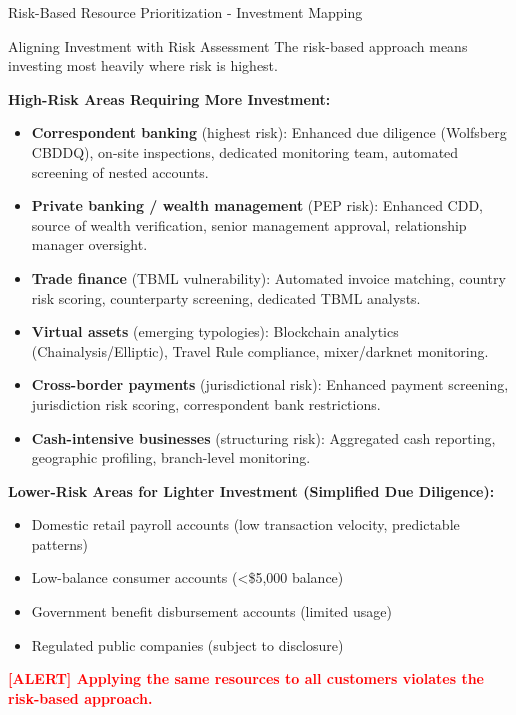 \documentclass[11pt,a4paper]{beamer}
\newcommand{\redflag}[1]{\textcolor{red}{\textbf{[ALERT] #1}}}
\begin{document}
\begin{frame}{Risk-Based Resource Prioritization - Investment Mapping}
	\begin{block}{Aligning Investment with Risk Assessment}
		The risk-based approach means investing most heavily where risk is highest.
	\end{block}
	\textbf{High-Risk Areas Requiring More Investment:}
	\begin{itemize}
		\item \textbf{Correspondent banking} (highest risk): Enhanced due diligence (Wolfsberg CBDDQ), on-site inspections, dedicated monitoring team, automated screening of nested accounts.
		\item \textbf{Private banking / wealth management} (PEP risk): Enhanced CDD, source of wealth verification, senior management approval, relationship manager oversight.
		\item \textbf{Trade finance} (TBML vulnerability): Automated invoice matching, country risk scoring, counterparty screening, dedicated TBML analysts.
		\item \textbf{Virtual assets} (emerging typologies): Blockchain analytics (Chainalysis/Elliptic), Travel Rule compliance, mixer/darknet monitoring.
		\item \textbf{Cross-border payments} (jurisdictional risk): Enhanced payment screening, jurisdiction risk scoring, correspondent bank restrictions.
		\item \textbf{Cash-intensive businesses} (structuring risk): Aggregated cash reporting, geographic profiling, branch-level monitoring.
	\end{itemize}
	\textbf{Lower-Risk Areas for Lighter Investment (Simplified Due Diligence):}
	\begin{itemize}
		\item Domestic retail payroll accounts (low transaction velocity, predictable patterns)
		\item Low-balance consumer accounts (<\$5,000 balance)
		\item Government benefit disbursement accounts (limited usage)
		\item Regulated public companies (subject to disclosure)
	\end{itemize}
	\redflag{Applying the same resources to all customers violates the risk-based approach.}
\end{frame}

\end{document}
